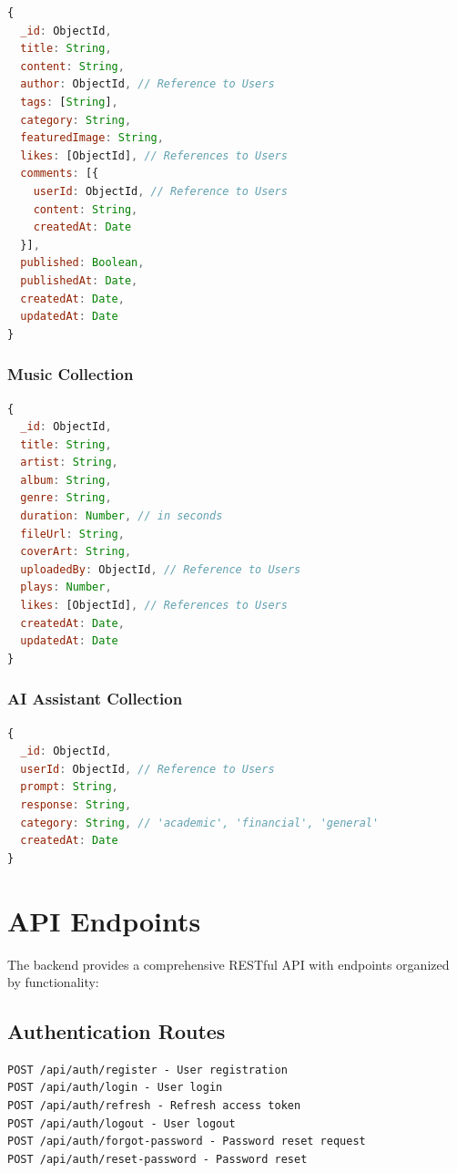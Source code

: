 \begin{lstlisting}[language=JavaScript, caption=Blog Schema]
{
  _id: ObjectId,
  title: String,
  content: String,
  author: ObjectId, // Reference to Users
  tags: [String],
  category: String,
  featuredImage: String,
  likes: [ObjectId], // References to Users
  comments: [{
    userId: ObjectId, // Reference to Users
    content: String,
    createdAt: Date
  }],
  published: Boolean,
  publishedAt: Date,
  createdAt: Date,
  updatedAt: Date
}
\end{lstlisting}

\subsubsection{Music Collection}

\begin{lstlisting}[language=JavaScript, caption=Music Schema]
{
  _id: ObjectId,
  title: String,
  artist: String,
  album: String,
  genre: String,
  duration: Number, // in seconds
  fileUrl: String,
  coverArt: String,
  uploadedBy: ObjectId, // Reference to Users
  plays: Number,
  likes: [ObjectId], // References to Users
  createdAt: Date,
  updatedAt: Date
}
\end{lstlisting}

\subsubsection{AI Assistant Collection}

\begin{lstlisting}[language=JavaScript, caption=AI Assistant Schema]
{
  _id: ObjectId,
  userId: ObjectId, // Reference to Users
  prompt: String,
  response: String,
  category: String, // 'academic', 'financial', 'general'
  createdAt: Date
}
\end{lstlisting}

\section{API Endpoints}

The backend provides a comprehensive RESTful API with endpoints organized by functionality:

\subsection{Authentication Routes}

\begin{verbatim}
POST /api/auth/register - User registration
POST /api/auth/login - User login
POST /api/auth/refresh - Refresh access token
POST /api/auth/logout - User logout
POST /api/auth/forgot-password - Password reset request
POST /api/auth/reset-password - Password reset
\end{verbatim}

